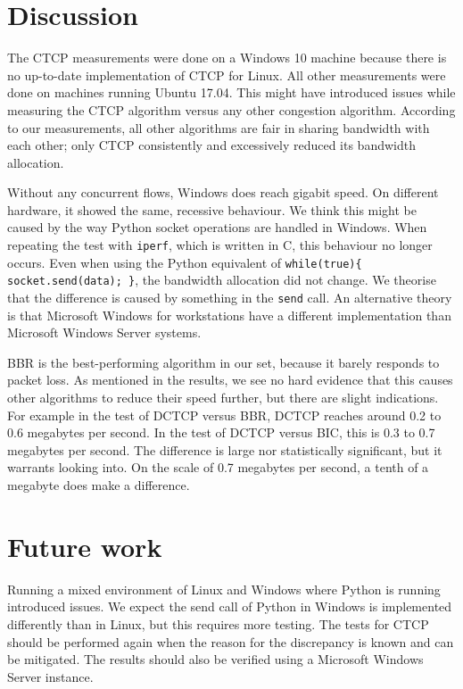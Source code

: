 \documentclass{article}
\begin{document}
\section{Discussion}\label{sec:discussion}

The CTCP measurements were done on a Windows 10 machine because there is no
up-to-date implementation of CTCP for Linux. All other measurements were done
on machines running Ubuntu 17.04. This might have introduced issues while
measuring the CTCP algorithm versus any other congestion algorithm. According
to our measurements, all other algorithms are fair in sharing bandwidth with
each other; only CTCP consistently and excessively reduced its bandwidth
allocation.

Without any concurrent flows, Windows does reach gigabit speed. On different
hardware, it showed the same, recessive behaviour. We think this might be
caused by the way Python socket operations are handled in Windows. When
repeating the test with \texttt{iperf}, which is written in C, this behaviour
no longer occurs. Even when using the Python equivalent of
\texttt{while(true)\{ socket.send(data); \}}, the bandwidth allocation did not
change. We theorise that the difference is caused by something in the
\texttt{send} call. An alternative theory is that Microsoft Windows for
workstations have a different implementation than Microsoft Windows Server
systems.

BBR is the best-performing algorithm in our set, because it barely responds to
packet loss. As mentioned in the results, we see no hard evidence that this
causes other algorithms to reduce their speed further, but there are slight
indications. For example in the test of DCTCP versus BBR, DCTCP reaches around
0.2 to 0.6 megabytes per second. In the test of DCTCP versus BIC, this is 0.3
to 0.7 megabytes per second. The difference is large nor statistically
significant, but it warrants looking into. On the scale of 0.7 megabytes per
second, a tenth of a megabyte does make a difference.


\section{Future work}\label{sec:futurework}

Running a mixed environment of Linux and Windows where Python is running
introduced issues. We expect the send call of Python in Windows is implemented
differently than in Linux, but this requires more testing. The tests for CTCP
should be performed again when the reason for the discrepancy is known and can
be mitigated. The results should also be verified using a Microsoft Windows
Server instance.
\end{document}
